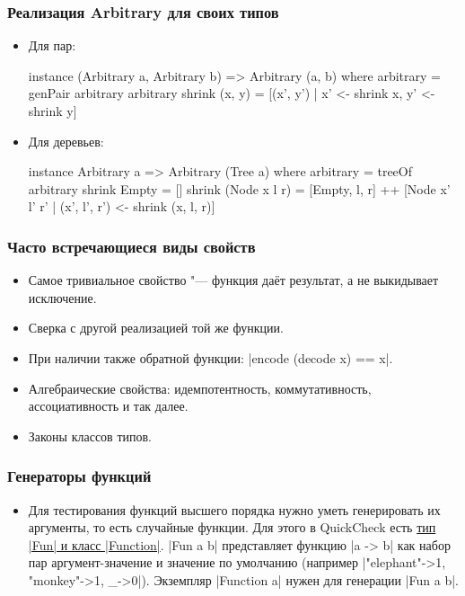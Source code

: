 \documentclass[11pt]{beamer}
\begin{document}
\begin{frame}[fragile]
  \frametitle{Реализация Arbitrary для своих типов}
  \begin{itemize}
    \item Для пар:
          \begin{haskell}
            instance (Arbitrary a, Arbitrary b) => Arbitrary (a, b) where
              arbitrary = genPair arbitrary arbitrary
              shrink (x, y) = [(x', y') | x' <- shrink x, y' <- shrink y]
          \end{haskell}
    \item Для деревьев:
          \begin{haskell}
            instance Arbitrary a => Arbitrary (Tree a) where
              arbitrary = treeOf arbitrary
              shrink Empty = []
              shrink (Node x l r) = 
                [Empty, l, r] ++
                [Node x' l' r' | 
                  (x', l', r') <- shrink (x, l, r)]
          \end{haskell}
  \end{itemize}
\end{frame}

\begin{frame}[fragile]
  \frametitle{Часто встречающиеся виды свойств}
  \begin{itemize}
    \item Самое тривиальное свойство "--- функция даёт результат, а не выкидывает исключение.
    \item Сверка с другой реализацией той же функции.
    \item При наличии также обратной функции: \haskinline|encode (decode x) == x|.
    \item Алгебраические свойства: идемпотентность, коммутативность, ассоциативность и так далее.
    \item Законы классов типов.
  \end{itemize}
\end{frame}

\begin{frame}[fragile]
  \frametitle{Генераторы функций}
  \begin{itemize}
    \item Для тестирования функций высшего порядка нужно уметь генерировать их аргументы, то есть случайные функции. Для этого в QuickCheck есть \href{http://hackage.haskell.org/package/QuickCheck-2.13.1/docs/Test-QuickCheck.html#g:14}{тип \haskinline|Fun| и класс \haskinline|Function|}. \haskinline|Fun a b| представляет функцию \haskinline|a -> b| как набор пар аргумент-значение и значение по умолчанию (например \haskinline|{"elephant"->1, "monkey"->1, _->0}|). Экземпляр \haskinline|Function a| нужен для генерации \haskinline|Fun a b|.
  \end{itemize}
\end{frame}
\end{document}
